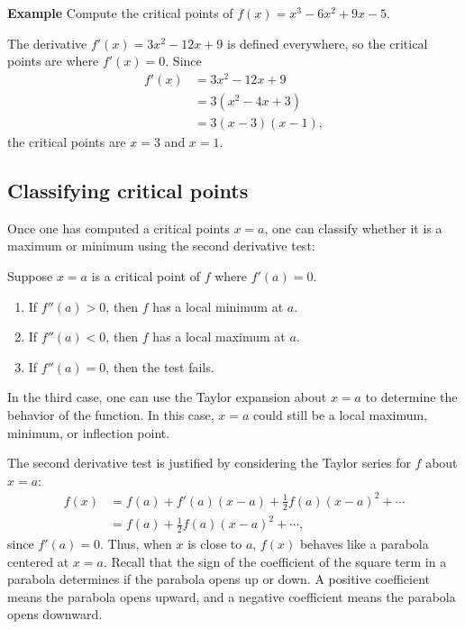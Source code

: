 \documentclass[twoside,openright,titlepage,a4paper]{book}
\begin{document}
\begin{sloppypar}
\textbf{Example} Compute the critical points of $f(x) = x^3 - 6x^2+9x-5$. 
\begin{examplebox}
The derivative $f'(x) = 3x^2 - 12x+9$ is defined everywhere, so the critical points are where $f'(x)=0$. Since
\begin{align*}
f'(x) &= 3x^2-12x+9 \\
&= 3(x^2-4x+3) \\
&= 3(x-3)(x-1),
\end{align*}
the critical points are $x=3$ and $x=1$.
\end{examplebox}
	
\subsection{Classifying critical points}

Once one has computed a critical points $x=a$, one can classify whether it is a maximum or minimum using the second derivative test:

\begin{definitionbox}[title=\textbf{Second Derivative Test}]
Suppose $x=a$ is a critical point of $f$ where $f'(a)=0$.
\begin{enumerate}
\item If $f''(a)>0$, then $f$ has a local minimum at $a$.
\item If $f''(a)<0$, then $f$ has a local maximum at $a$.
\item If $f''(a)=0$, then the test fails.
\end{enumerate}	
In the third case, one can use the Taylor expansion about $x=a$ to determine the behavior of the function. In this case, $x=a$ could still be a local maximum, minimum, or inflection point.
\end{definitionbox}
	
The second derivative test is justified by considering the Taylor series for $f$ about $x=a$:
\begin{align*}
f(x) &= f(a) + f'(a)(x-a) + \frac{1}{2}f(a)(x-a)^2+\dotsb \\
&= f(a) + \frac{1}{2}f(a)(x-a)^2 + \dotsb,
\end{align*}
since $f'(a)=0$. Thus, when $x$ is close to $a$, $f(x)$ behaves like a parabola centered at $x=a$. Recall that the sign of the coefficient of the square term in a parabola determines if the parabola opens up or down. A positive coefficient means the parabola opens upward, and a negative coefficient means the parabola opens downward.


\end{sloppypar}
\end{document}
